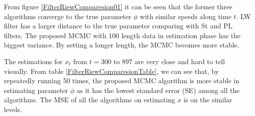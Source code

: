 

From figure \ref{FilterRiewComparesion01} it can be seen that the former three algorithms converge to the true parameter $\phi$ with similar speeds along time $t$. LW filter has a larger distance to the true parameter comparing with St and PL filters. The proposed MCMC with 100 length data in estimation phase has the biggest variance. By setting a longer length, the MCMC becomes more stable. 

The estimations for $x_t$ from $t=300$ to $897$ are very close and hard to tell visually. From table \ref{FilterRiewComparesionTable}, we can see that, by repeatedly running 50 times, the proposed MCMC algorithm is more stable in estimating parameter $\phi$ as it has the lowest standard error (SE) among all the algorithms. The MSE of all the algorithms on estimating $x$ is on the similar levels. 


